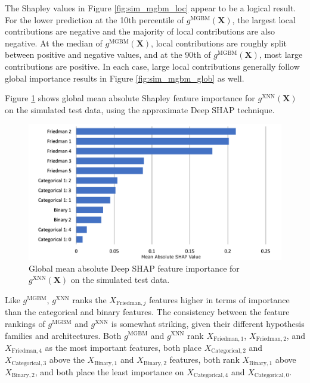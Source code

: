 \documentclass[information,article,accept,moreauthors,pdftex]{Definitions/mdpi}
\begin{document}
The Shapley values in Figure \ref{fig:sim_mgbm_loc} appear to be a logical result. For the lower prediction at the 10{th} percentile of $g^\text{MGBM}(\mathbf{X})$, the largest local contributions are negative and the majority of local contributions are also negative. At the median of $g^\text{MGBM}(\mathbf{X})$, local contributions are roughly split between positive and negative values, and at the 90{th} of $g^\text{MGBM}(\mathbf{X})$, most large contributions are positive. In each case, large local contributions generally follow global importance results in Figure \ref{fig:sim_mgbm_glob} as well.

Figure \ref{fig:sim_xnn_glob} shows global mean absolute Shapley feature importance for $g^\text{XNN}(\mathbf{X})$ on the simulated test data, using the approximate Deep SHAP technique.  

\begin{figure}[H]
\centering
	\captionsetup{width=16cm}
	\centering
	\includegraphics[width=12cm]{img/sim_xnn_glob.png}
	\caption{Global mean absolute Deep SHAP feature importance for $g^\text{XNN}(\mathbf{X})$ on the simulated test data.}
	\label{fig:sim_xnn_glob}
\end{figure} 

Like $g^\text{MGBM}$, $g^\text{XNN}$ ranks the $X_{\text{Friedman},j}$ features higher in terms of importance than the categorical and binary features. The consistency between the feature rankings of $g^\text{MGBM}$ and $g^\text{XNN}$ is somewhat striking, given their different hypothesis families and architectures. Both $g^\text{MGBM}$ and $g^\text{XNN}$ rank $X_{\text{Friedman},1}$, $X_{\text{Friedman},2}$, and $X_{\text{Friedman},4}$ as the most important features, both place $X_{\text{Categorical},2}$ and $X_{\text{Categorical},3}$ above the $X_{\text{Binary},1}$ and $X_{\text{Binary},2}$ features, both rank $X_{\text{Binary},1}$ above $X_{\text{Binary},2}$, and both place the least importance on $X_{\text{Categorical},4}$ and $X_{\text{Categorical},0}$. 
\end{document}
